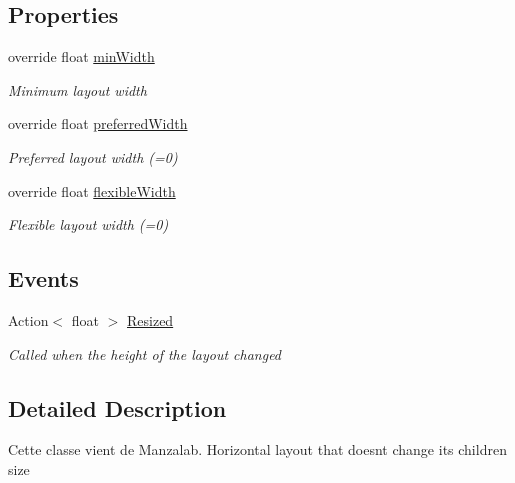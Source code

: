 \subsection*{Properties}
\begin{DoxyCompactItemize}
\item 
override float \hyperlink{class_simple_horizontal_layout_a6419ca81d876404a5a67bc0d8b23ae51}{min\+Width}
\begin{DoxyCompactList}\small\item\em Minimum layout width \end{DoxyCompactList}\item 
override float \hyperlink{class_simple_horizontal_layout_ac248bb3c170c1e087fe1b347518c0a08}{preferred\+Width}
\begin{DoxyCompactList}\small\item\em Preferred layout width (=0) \end{DoxyCompactList}\item 
override float \hyperlink{class_simple_horizontal_layout_a85f36db62a7155c16bfdb0cec50102b0}{flexible\+Width}
\begin{DoxyCompactList}\small\item\em Flexible layout width (=0) \end{DoxyCompactList}\end{DoxyCompactItemize}
\subsection*{Events}
\begin{DoxyCompactItemize}
\item 
Action$<$ float $>$ \hyperlink{class_simple_horizontal_layout_a75ae5219de178cf2a3329b74a7641649}{Resized}
\begin{DoxyCompactList}\small\item\em Called when the height of the layout changed \end{DoxyCompactList}\end{DoxyCompactItemize}


\subsection{Detailed Description}
Cette classe vient de Manzalab. Horizontal layout that doesn\textquotesingle{}t change its children size 



